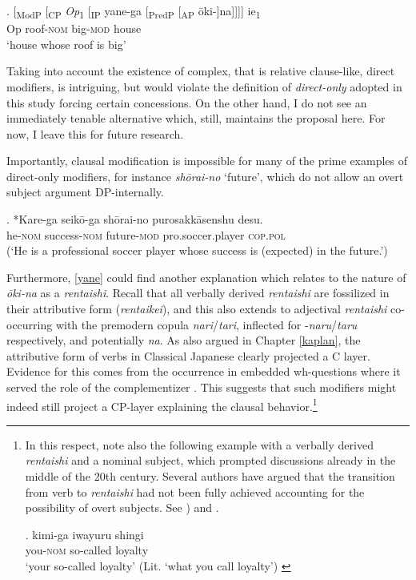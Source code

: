 \documentclass [output=book,colorlinks,citecolor=brown]{langscibook}
\begin{document}
\exg. [\textsubscript{ModP} [\textsubscript{CP} \textit{Op}\textsubscript{1} [\textsubscript{IP} yane-ga [\textsubscript{PredP} [\textsubscript{AP} ōki-]na]]]] ie\textsubscript{1}\\
{} {} Op {} roof-\textsc{nom} {} {} big-\textsc{mod} house\\
`house whose roof is big’

Taking into account the existence of complex, that is relative clause-like, direct modifiers, is intriguing, but would violate the definition of \textit{direct-only} adopted in this study forcing certain concessions. On the other hand, I do not see an immediately tenable alternative which, still, maintains the proposal here. For now, I leave this for future research.

Importantly, clausal modification is impossible for many of the prime examples of direct-only modifiers, for instance \textit{shōrai-no} `future’, which do not allow an overt subject argument DP-internally.

\exg. *Kare-ga seikō-ga shōrai-no purosakkāsenshu desu.\\
he-\textsc{nom} success-\textsc{nom} future-\textsc{mod} pro.soccer.player \textsc{cop.pol}\\
(`He is a professional soccer player whose success is (expected) in the future.’)

Furthermore, \ref{yane} could find another explanation which relates to the nature of \textit{ōki-na} as a \textit{rentaishi}. Recall that all verbally derived \textit{rentaishi} are fossilized in their attributive form (\textit{rentaikei}), and this also extends to adjectival \textit{rentaishi} co-occurring with the premodern copula \textit{nari}/\textit{tari}, inflected for -\textit{naru}/\textit{taru} respectively, and potentially \textit{na}. As also argued in Chapter \ref{kaplan}, the attributive form of verbs in Classical Japanese clearly projected a C layer. Evidence for this comes from the occurrence in embedded wh-questions where it served the role of the complementizer \citep{kinsui:1995:iwayuru, kaplan:1995:the, hiraiwa:2005:dimensions}. This suggests that such modifiers might indeed still project a CP-layer explaining the clausal behavior.\footnote{In this respect, note also the following example with a verbally derived \textit{rentaishi} and a nominal subject, which prompted discussions already in the middle of the 20th century. Several authors have argued that the transition from verb to \textit{rentaishi} had not been fully achieved accounting for the possibility of overt subjects. See \citet{sekine:1937:fukutaishi, matsushita:1976:kaisen}) and \citet{kieda:1938:koto}.

\par

\exg. kimi-ga iwayuru shingi\\
you-\textsc{nom} so-called loyalty\\
`your so-called loyalty' (Lit. `what you call loyalty’) \null \hfill \citep[1:28]{sekine:1937:fukutaishi}

\par

}
\end{document}
